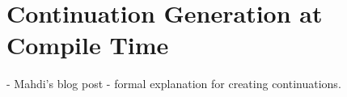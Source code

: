 \section{Continuation Generation at Compile Time}

- Mahdi's blog post 
- formal explanation for creating continuations.